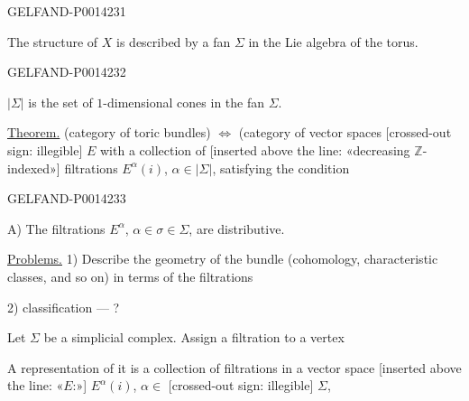 \begin{GelfandAdjacentEvidence}{GELFAND-P001423}{1}

The structure of \(X\) is described by a fan \(\Sigma\) in the Lie algebra of the torus.

\end{GelfandAdjacentEvidence}
\begin{GelfandAdjacentEvidence}{GELFAND-P001423}{2}


\(|\Sigma|\) is the set of \(1\)-dimensional cones in the fan \(\Sigma\).

\uline{Theorem.}
(category of toric bundles) \(\Longleftrightarrow\)
(category of vector spaces [crossed-out sign: illegible] \(E\)
with a collection of [inserted above the line: «decreasing \(\mathbb Z\)-indexed»]
filtrations \(E^\alpha(i)\), \(\alpha\in|\Sigma|\), satisfying the condition
\end{GelfandAdjacentEvidence}
\begin{GelfandAdjacentEvidence}{GELFAND-P001423}{3}


A) The filtrations \(E^\alpha\), \(\alpha\in\sigma\in\Sigma\), are distributive.

\uline{Problems.}
1) Describe the geometry of the bundle (cohomology, characteristic classes, and so on) in terms of the filtrations

2) classification — ?

Let \(\Sigma\) be a simplicial complex. Assign a filtration to a vertex

A representation of it is a collection of filtrations in a vector space [inserted above the line: «\(E\):»] \(E^\alpha(i)\),
\(\alpha\in\) [crossed-out sign: illegible] \(\Sigma\),
\end{GelfandAdjacentEvidence}
